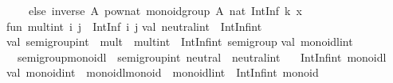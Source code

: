\begin{isabellebody}
\begin{isamarkuptext}
\ \ \ \ else\ inverse\ A{}\ {}pow{}nat\ {}monoid{}group\ A{}{}\ {}nat\ {}IntInf{}{}\ k{}{}\ x{}{}{}\isanewline
\isanewline
fun\ mult{}int\ i\ j\ {}\ IntInf{}{}\ {}i{}\ j{}{}\isanewline
\isanewline
val\ neutral{}int\ {}\ IntInf{}int\ {}\ {}{}\isanewline
\isanewline
val\ semigroup{}int\ {}\ {}mult\ {}\ mult{}int{}\ {}\ IntInf{}int\ semigroup{}\isanewline
\isanewline
val\ monoidl{}int\ {}\isanewline
\ \ {}semigroup{}monoidl\ {}\ semigroup{}int{}\ neutral\ {}\ neutral{}int{}\ {}\isanewline
\ \ IntInf{}int\ monoidl{}\isanewline
\isanewline
val\ monoid{}int\ {}\ {}monoidl{}monoid\ {}\ monoidl{}int{}\ {}\ IntInf{}int\ monoid{}\isanewline

\end{isamarkuptext}
\end{isabellebody}
